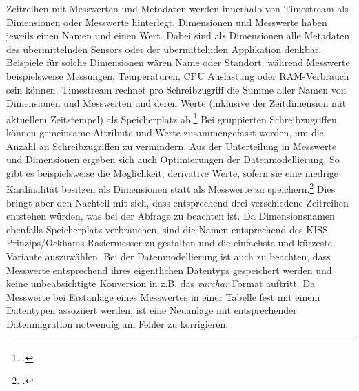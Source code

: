 Zeitreihen mit Messwerten und Metadaten werden innerhalb von Timestream als Dimensionen oder Messwerte hinterlegt. Dimensionen und Messwerte haben jeweils einen Namen und einen Wert. Dabei sind als Dimensionen alle Metadaten des übermittelnden Sensors oder der übermittelnden Applikation denkbar. Beispiele für solche Dimensionen wären Name oder Standort, während Messwerte beispielsweise \coo{} Messungen, Temperaturen, CPU Auslastung oder \ac{RAM}-Verbrauch sein können. Timestream rechnet pro Schreibzugriff die Summe aller Namen von Dimensionen und Messwerten und deren Werte (inklusive der Zeitdimension mit aktuellem Zeitstempel) als Speicherplatz ab.\footcite[Vgl. auch im Folgenden][]{AmazonWebServicesInc..o.J.bs} Bei gruppierten Schreibzugriffen können gemeinsame Attribute und Werte zusammengefasst werden, um die Anzahl an Schreibzugriffen zu vermindern.
Aus der Unterteilung in Messwerte und Dimensionen ergeben sich auch Optimierungen der Datenmodellierung. So gibt es beispielsweise die Möglichkeit, derivative Werte, sofern sie eine niedrige Kardinalität besitzen als Dimensionen statt als Messwerte zu speichern.\footcite[Vgl. auch im Folgenden][]{AmazonWebServicesInc..o.J.bt} Dies bringt aber den Nachteil mit sich, dass entsprechend drei verschiedene Zeitreihen entstehen würden, was bei der Abfrage zu beachten ist. Da Dimensionsnamen ebenfalls Speicherplatz verbrauchen, sind die Namen entsprechend des KISS-Prinzips/Ockhams Rasiermesser zu gestalten und die einfachste und kürzeste Variante auszuwählen. Bei der Datenmodellierung ist auch zu beachten, dass Messwerte entsprechend ihres eigentlichen Datentyps gespeichert werden und keine unbeabsichtigte Konversion in z.B. das \textit{varchar} Format auftritt. Da Messwerte bei Erstanlage eines Messwertes in einer Tabelle fest mit einem Datentypen assoziiert werden, ist eine Neuanlage mit entsprechender Datenmigration notwendig um Fehler zu korrigieren.



